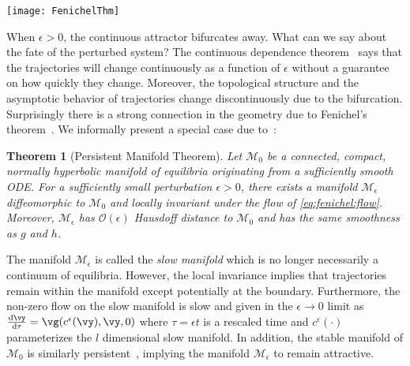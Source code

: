 \documentclass{article} %
\newcounter{ct}
\newcommand{\dm}[1]{\ensuremath{\mathrm{d}{#1}}} %
\newcommand{\RN}[2]{\frac{\dm{#1}}{\dm{#2}}} %
\newcommand{\manifold}{\mathcal{M}}
\newtheorem{theorem}{Theorem}
\theoremstyle{definition}
\theoremstyle{remark}
\renewcommand{\cite}{\citep}
\begin{document}
\begin{SCfigure}[10][bthp]
  \centering
  \texttt{[image: FenichelThm]}
  \caption{
    Persistent manifold theorem applied to compact continuous attractor guarantees the flow on the slow manifold $\manifold_\epsilon$ is locally invariant and continues to be attractive.
    The dashed line is a trajectory ``trapped'' in the slow manifold (locally invariant). %
  }
  \label{fig:fenichel}
\end{SCfigure}

When $\epsilon > 0$, the continuous attractor bifurcates away.
What can we say about the fate of the perturbed system?
The continuous dependence theorem~\citep{Chicone2006} says that the trajectories will change continuously as a function of $\epsilon$ without a guarantee on how quickly they change.
Moreover, the topological structure and the asymptotic behavior of trajectories change discontinuously due to the bifurcation.
Surprisingly there is a strong connection in the geometry due to Fenichel's theorem~\cite{fenichel1971}.
We informally present a special case due to~\citet{Jones1995}:
\begin{theorem}[Persistent Manifold Theorem]
Let $\manifold_0$ be a connected, compact, normally hyperbolic manifold of equilibria originating from a sufficiently smooth ODE.
For a sufficiently small perturbation $\epsilon > 0$, there exists a manifold $\manifold_\epsilon$ diffeomorphic to $\manifold_0$ and locally invariant under the flow of \eqref{eq:fenichel:flow}.
Moreover, $\manifold_\epsilon$ has $\mathcal{O}(\epsilon)$ Hausdoff distance to $\manifold_0$ and has the same smoothness as $g$ and $h$. %
\end{theorem}

The manifold $\manifold_\epsilon$ is called the \emph{slow manifold} which is no longer necessarily a continuum of equilibria.
However, the local invariance implies that trajectories remain within the manifold except potentially at the boundary.
Furthermore, the non-zero flow on the slow manifold is slow and given in the $\epsilon \to 0$ limit as $\RN{\vy}{\tau} = \vg(c^\epsilon(\vy), \vy, 0)$ where $\tau = \epsilon t$ is a rescaled time and $c^\epsilon(\cdot)$ parameterizes the $l$ dimensional slow manifold.
In addition, the stable manifold of $\manifold_0$ is similarly  persistent~\cite{Jones1995}, implying the manifold $\manifold_\epsilon$ to remain attractive.
\end{document}
